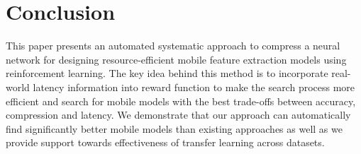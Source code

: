 \documentclass[../main]{subfiles}
\begin{document}
\section{Conclusion}
This paper presents an automated systematic approach to compress a neural network for designing resource-efficient mobile feature extraction models using reinforcement learning.
The key idea behind this method is to incorporate real-world latency information into reward function to make the search process more efficient and search for mobile models with the best trade-offs between accuracy, compression and latency.
We demonstrate that our approach can automatically find significantly better mobile models than existing approaches as well as we provide support towards effectiveness of transfer learning across datasets.
\end{document}
